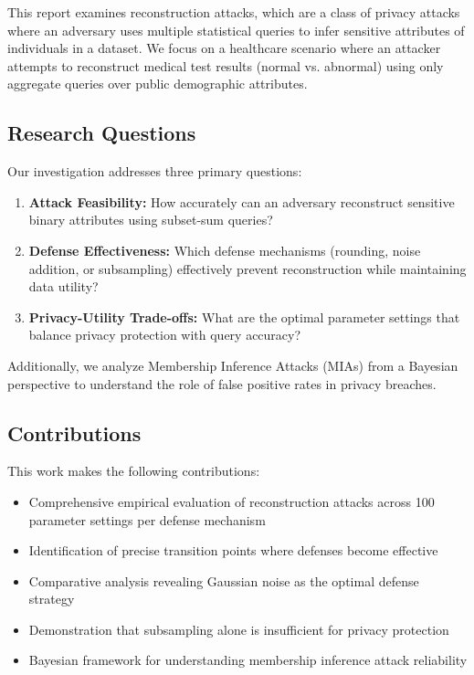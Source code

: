 \documentclass[11pt,letterpaper]{article}
\begin{document}
This report examines reconstruction attacks, which are a class of privacy attacks where an adversary uses multiple statistical queries to infer sensitive attributes of individuals in a dataset. We focus on a healthcare scenario where an attacker attempts to reconstruct medical test results (normal vs. abnormal) using only aggregate queries over public demographic attributes.

\subsection{Research Questions}

Our investigation addresses three primary questions:

\begin{enumerate}[leftmargin=*]
    \item \textbf{Attack Feasibility:} How accurately can an adversary reconstruct sensitive binary attributes using subset-sum queries?
    \item \textbf{Defense Effectiveness:} Which defense mechanisms (rounding, noise addition, or subsampling) effectively prevent reconstruction while maintaining data utility?
    \item \textbf{Privacy-Utility Trade-offs:} What are the optimal parameter settings that balance privacy protection with query accuracy?
\end{enumerate}

Additionally, we analyze Membership Inference Attacks (MIAs) from a Bayesian perspective to understand the role of false positive rates in privacy breaches.

\subsection{Contributions}

This work makes the following contributions:

\begin{itemize}[leftmargin=*]
    \item Comprehensive empirical evaluation of reconstruction attacks across 100 parameter settings per defense mechanism
    \item Identification of precise transition points where defenses become effective
    \item Comparative analysis revealing Gaussian noise as the optimal defense strategy
    \item Demonstration that subsampling alone is insufficient for privacy protection
    \item Bayesian framework for understanding membership inference attack reliability
\end{itemize}
\end{document}
